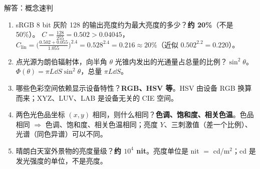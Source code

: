 \begin{exam}{解答：概念速判}
\begin{enumerate}
\item sRGB 8 bit 灰阶 128 的输出亮度约为最大亮度的多少？\quad\textbf{约 20\%}（不是 50\%）。
$C=\frac{128}{255}=0.502>0.04045$，$C_{\text{lin}}=\big(\frac{0.502+0.055}{1.055}\big)^{2.4}=0.528^{2.4}=0.216\approx20\%$（近似 $0.502^{2.2}=0.220$）。
\item 点光源为朗伯辐射体，向半角 $\theta$ 光锥内发出的光通量占总量的比例？\quad\textbf{$\sin^2\theta$}。$\Phi(\theta)=\pi L\dd S\sin^2\theta$，总量 $\pi L\dd S$。
\item 哪些色彩空间依赖显示设备特性？\quad\textbf{RGB、HSV 等}。HSV 由设备 RGB 换算而来；XYZ、LUV、LAB 是设备无关的 CIE 空间。
\item 两色光色品坐标 $(x,y)$ 相同，则什么相同？\quad\textbf{色调、饱和度、相关色温}。色品相同 $\Rightarrow$ 色调、饱和度、相关色温相同；亮度 $Y$、三刺激值（差一个比例）、光谱（同色异谱）可以不同。
\item 晴朗白天室外景物的亮度量级？\quad\textbf{约 $10^4$ nit}。亮度单位是 nit $=$ cd/m$^2$；cd 是发光强度的单位，不是亮度。
\end{enumerate}
\end{exam}

